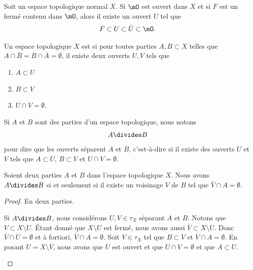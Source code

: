 \begin{lemma}        \label{LEMooVVASooEXYKOZ}
	Soit un espace topologique normal \( X\). Si \( \mO\) est ouvert dans \( X\) et si \( F\) est un fermé contenu dans \( \mO\), alors il existe un ouvert \( U\) tel que
	\begin{equation}
		F\subset U\subset\bar U\subset \mO.
	\end{equation}
\end{lemma}


\begin{definition}	\label{DEFooTLVHooYWvDIu}
	Un espace topologique \( X\) est  si pour toutes parties \( A,B\subset X\) telles que \( A\cap\bar B=B\cap\bar A=\emptyset\), il existe deux ouverts \( U,V\) tels que
	\begin{enumerate}
		\item
		      \( A\subset U\)
		\item
		      \( B\subset V\)
		\item
		      \( U\cap V=\emptyset\).
	\end{enumerate}
\end{definition}

Si \( A\) et \( B\) sont des parties d'un espace topologique, nous notons
\begin{equation}
	A\divides B
\end{equation}
pour dire que les ouverts séparent \( A\) et \( B\), c'est-à-dire si il existe des ouverts \( U\) et \( V\) tels que \( A\subset U\), \( B\subset V\) et \( U\cap V=\emptyset\).

\begin{lemma}	\label{LEMooWORZooAFZSDS}
	Soient deux parties \( A\) et \( B\) dans l'espace topologique \( X\). Nous avons \( A\divides B\) si et seulement si il existe un voisinage \( V\) de \( B\) tel que \( \bar V\cap A=\emptyset\).
\end{lemma}


\begin{proof}
	En deux parties.
	\begin{subproof}
		\spitem[\( \Rightarrow\)]
		Si \( A\divides B\), nous considérons \( U,V\in \tau_X\) séparant \( A\) et \( B\). Notons que \( V\subset X\setminus U\). Étant donné que \( X\setminus U\) est fermé, nous avons aussi \( \bar V\subset X\setminus U\). Donc \( \bar V\cap U=\emptyset\) et à fortiori, \( \bar V\cap  A=\emptyset\).
		\spitem[\( \Leftarrow\)]
		Soit \( V\in\tau_X\) tel que \( B\subset V\) et \( \bar V\cap A=\emptyset\). En posant \( U=X\setminus \bar V\), nous avons que \( U\) est ouvert et que \( U\cap V=\emptyset\) et que \( A\subset U\).
	\end{subproof}
\end{proof}

